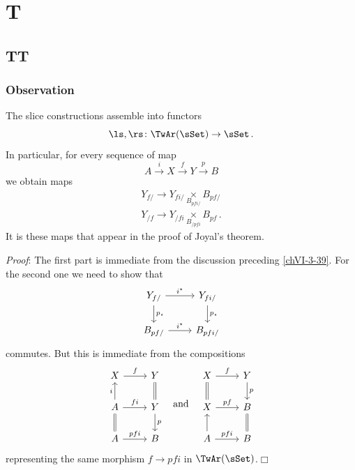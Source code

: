\chapter{T}

\section{TT}

    \subsection{Observation}\label{chVI-3-40}
        The slice constructions assemble into functors
        \begin{equation*}
            \ls, \rs \colon \TwAr(\sSet) \to \sSet \,.
        \end{equation*}
        In particular, for every sequence of map
        \begin{equation*}
            A \xrightarrow{i} X \xrightarrow{f} Y \xrightarrow{p} B
        \end{equation*}	
        we obtain maps
        \begin{align*}
            Y_{f /} \to Y_{f i /} \underset{B_{p f i /}}{\times} B_{p f /} \\
            Y_{/ f} \to Y_{/ f i} \underset{B_{/ p f i}}{\times} B_{p f} \,.
        \end{align*}
        It is these maps that appear in the proof of Joyal's theorem.
        \smallskip

        \emph{Proof}: The first part is immediate from the discussion preceding \ref{chVI-3-39}. For the second one we need to show that
        \begin{equation*}
            \begin{tikzcd}
                Y_{f/} \arrow[d, "p_{\star}"] \arrow[r, "i^{\star}"] & Y_{f i /} \arrow[d, "p_{\star}"] \\
                B_{p f /} \arrow[r, "i^{\star}"] & B_{p f i /}
            \end{tikzcd}	
        \end{equation*}
        commutes. But this is immediate from the compositions
        \begin{equation*}
            \begin{tikzcd}
                X \arrow[r, "f"] & Y \arrow[d, equal] \\
                A \arrow[d, equal] \arrow[u, "i"] \arrow[r, "f i"] & Y \arrow[d, "p"] \\
                A \arrow[r, "p f i"] & B
            \end{tikzcd}
            \quad \text{and} \quad
            \begin{tikzcd}
                X \arrow[d, equal] \arrow[r, "f"] & Y \arrow[d, "p"] \\
                X \arrow[r, "p f"] & B \arrow[d, equal] \\
                A \arrow[u] \arrow[r, "p f i"] & B
            \end{tikzcd}	
        \end{equation*}
        representing the same morphism $f \to p f i$ in $\TwAr(\sSet)$.\hfill$\Box$
        \medskip


